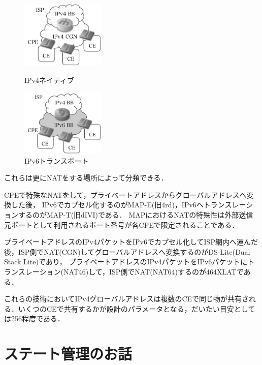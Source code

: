 \begin{figure}[htbp]
 \begin{minipage}{0.5\hsize}
  \begin{center}
   \includegraphics[bb=0 0 175 140,width=40mm]{./yuyarin/cgn.pdf}
  \end{center}
  \caption{IPv4ネイティブ}
  \label{fig:one}
 \end{minipage}
 \begin{minipage}{0.5\hsize}
  \begin{center}
   \includegraphics[bb=0 0 175 140,width=40mm]{./yuyarin/v6transport.pdf}
  \end{center}
  \caption{IPv6トランスポート}
  \label{fig:two}
 \end{minipage}
\end{figure}

これらは更にNATをする場所によって分類できる．

CPEで特殊なNATをして，プライベートアドレスからグローバルアドレスへ変換した後，
IPv6でカプセル化するのがMAP-E(旧4rd)，IPv6へトランスレーションするのがMAP-T(旧dIVI)である．
MAPにおけるNATの特殊性は外部送信元ポートとして利用されるポート番号が各CPEで限定されることである．

プライベートアドレスのIPv4パケットをIPv6でカプセル化してISP網内へ運んだ後，ISP側でNAT(CGN)してグローバルアドレスへ変換するのがDS-Lite(Dual Stack Lite)であり，
プライベートアドレスのIPv4パケットをIPv6パケットにトランスレーション(NAT46)して，ISP側でNAT(NAT64)するのが464XLATである．

これらの技術においてIPv4グローバルアドレスは複数のCEで同じ物が共有される．いくつのCEで共有するかが設計のパラメータとなる，だいたい目安としては256程度である．

\section{ステート管理のお話}


